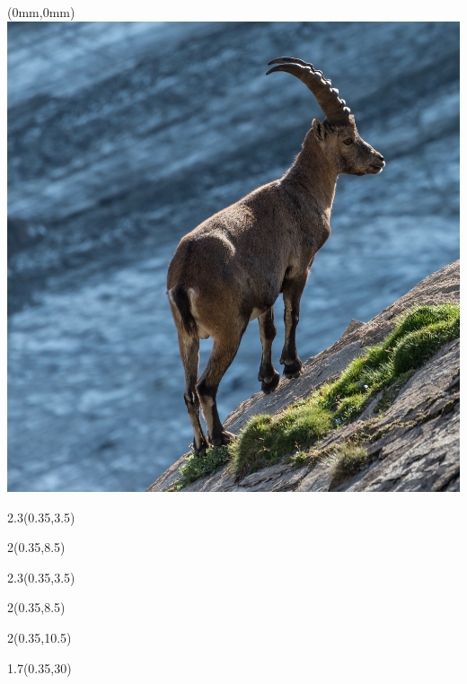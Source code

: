 \begin{textblock*}{\paperwidth}(0mm,0mm)
  \includegraphics[width=\paperwidth,%
                   keepaspectratio=true]{Steinbock}
\end{textblock*}

\begin{textblock*}{2.3\TPHorizModule}(0.35\TPHorizModule,3.5\TPVertModule)
  \textcolor{white}{\titlefmt}
\end{textblock*}

\begin{textblock*}{2\TPHorizModule}(0.35\TPHorizModule,8.5\TPVertModule)
  \textcolor{white}{\authorfmt}
\end{textblock*}

\null\cleardoublepage


\begin{textblock*}{2.3\TPHorizModule}(0.35\TPHorizModule,3.5\TPVertModule)
  \titlefmt
\end{textblock*}

\begin{textblock*}{2\TPHorizModule}(0.35\TPHorizModule,8.5\TPVertModule)
  \authorfmt
\end{textblock*}

\begin{textblock*}{2\TPHorizModule}(0.35\TPHorizModule,10.5\TPVertModule)
  \affiliation
\end{textblock*}

\begin{textblock*}{1.7\TPHorizModule}(0.35\TPHorizModule,30\TPVertModule)
  \edition
\end{textblock*}
\endgroup

